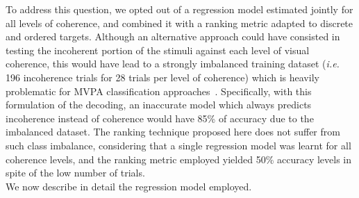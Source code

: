 To address this question, we opted out of a regression model estimated jointly for all levels of coherence, and combined it with a ranking metric adapted to discrete and ordered targets. Although an alternative approach could have consisted in testing the incoherent portion of the stimuli against each level of visual coherence, this would have lead to a strongly imbalanced training dataset (\textit{i.e.} 196 incoherence trials for 28 trials per level of coherence) which is heavily problematic for MVPA classification approaches~\cite{He:2009:LID:1591901.1592322}. Specifically, with this formulation of the decoding, an inaccurate model which always predicts incoherence instead of coherence would have 85\% of accuracy due to the imbalanced dataset. The ranking technique proposed here does not suffer from such class imbalance, considering that a single regression model was learnt for all coherence levels, and the ranking metric employed yielded 50\% accuracy levels in spite of the low number of trials.\\

We now describe in detail the regression model employed.

